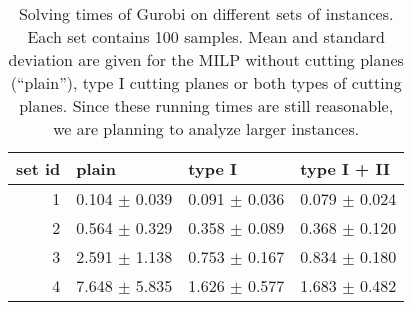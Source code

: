 

\begin{knitrout}
\color{fgcolor}\begin{table}

\caption{\label{tab:unnamed-chunk-2}Solving times of Gurobi on different sets of instances. Each set contains 100 samples. Mean and standard deviation are given for the MILP without cutting planes (``plain''), type I cutting planes or both types of cutting planes. {\color{blue} Since these running times are still reasonable, we are planning to analyze larger instances.} \label{tab:running_times}}
\centering
\begin{tabular}[t]{rlll}
\toprule
set id & plain & type I & type I + II\\
\midrule
1 & 0.104 $\pm$ 0.039 & 0.091 $\pm$ 0.036 & 0.079 $\pm$ 0.024\\
2 & 0.564 $\pm$ 0.329 & 0.358 $\pm$ 0.089 & 0.368 $\pm$ 0.120\\
3 & 2.591 $\pm$ 1.138 & 0.753 $\pm$ 0.167 & 0.834 $\pm$ 0.180\\
4 & 7.648 $\pm$ 5.835 & 1.626 $\pm$ 0.577 & 1.683 $\pm$ 0.482\\
\bottomrule
\end{tabular}
\end{table}

\end{knitrout}
